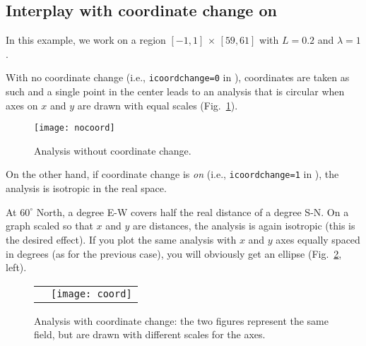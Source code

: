 



\subsection{Interplay with coordinate change on}

In this example, we work on a region $[-1,1]\, \times\, [59,61]$ with $L=0.2$ and $\lambda=1$.
 

With no coordinate change (i.e., \texttt{icoordchange=0} in ), coordinates are taken as such and
a single point in the center leads to an analysis that is circular when axes on $x$ and $y$ are drawn with equal scales (Fig.~\ref{fig:nocoord}).

\begin{figure}[H]
\centering
\texttt{[image: nocoord]}
\caption{Analysis without coordinate change.\label{fig:nocoord}}
\end{figure}


On the other hand, if coordinate change is \textsl{on} (i.e., \texttt{icoordchange=1} in ), the analysis is isotropic in the real space.

At $60^{\circ}$ North, a degree E-W covers half the real distance of a degree S-N. On a graph scaled so that $x$ and $y$ are distances, the analysis is again isotropic (this is the desired effect). If you plot the same analysis with $x$ and $y$ axes equally spaced in degrees (as for the previous case), you will obviously get an ellipse (Fig.~\ref{fig:coord}, left).

\begin{figure}[H]
\centering
\begin{tabular}{cc}
\raisebox{.2\textwidth}{\texttt{[image: coord]}}& \texttt{[image: coord]}\\
\end{tabular}
\caption[Analysis with coordinate change.]{Analysis with coordinate change: the two figures represent the same field, but are drawn with different scales for the axes.\label{fig:coord}}
\end{figure}


